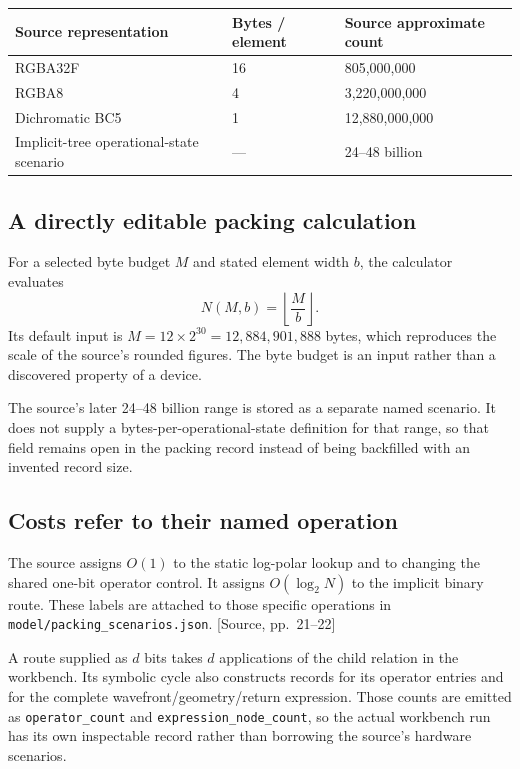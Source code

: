 \documentclass[11pt,a4paper]{article}
\newcommand{\src}[1]{{\sffamily\footnotesize\color{DWGray}[Source, pp.~#1]}}
\newcommand{\code}[1]{\texttt{#1}}
\begin{document}
{\small
\begin{tabularx}{\linewidth}{@{}YP{21mm}P{36mm}@{}}
\toprule
\textbf{Source representation} & \textbf{Bytes / element} & \textbf{Source approximate count}\\
\midrule
RGBA32F & 16 & 805,000,000\\
RGBA8 & 4 & 3,220,000,000\\
Dichromatic BC5 & 1 & 12,880,000,000\\
Implicit-tree operational-state scenario & --- & 24--48 billion\\
\bottomrule
\end{tabularx}}

\subsection{A directly editable packing calculation}
For a selected byte budget $M$ and stated element width $b$, the calculator evaluates
\begin{equation}
N(M,b)=\left\lfloor\frac{M}{b}\right\rfloor.
\end{equation}
Its default input is $M=12\times2^{30}=12{,}884{,}901{,}888$ bytes, which reproduces the scale of the source's rounded figures. The byte budget is an input rather than a discovered property of a device.

The source's later 24--48 billion range is stored as a separate named scenario. It does not supply a bytes-per-operational-state definition for that range, so that field remains open in the packing record instead of being backfilled with an invented record size.

\subsection{Costs refer to their named operation}
The source assigns $O(1)$ to the static log-polar lookup and to changing the shared one-bit operator control. It assigns $O(\log_2N)$ to the implicit binary route. These labels are attached to those specific operations in \code{model/packing\_scenarios.json}. \src{21--22}

A route supplied as $d$ bits takes $d$ applications of the child relation in the workbench. Its symbolic cycle also constructs records for its operator entries and for the complete wavefront/geometry/return expression. Those counts are emitted as \code{operator\_count} and \code{expression\_node\_count}, so the actual workbench run has its own inspectable record rather than borrowing the source's hardware scenarios.
\end{document}
